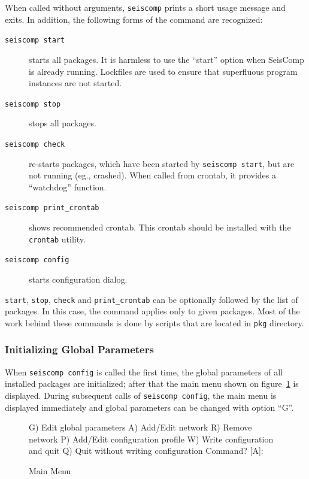 \documentclass[11pt,a4paper,titlepage]{article}
\newcommand{\dir}[1]{\texttt{#1}}
\newcommand{\cmd}[1]{\texttt{#1}}
\let\stditem\item
\newenvironment{cmdlist}{%
    \def\item[##1]{\stditem[\cmd{##1}]}%
    \begin{description}}
    {\end{description}}
\newcommand{\seiscomp}{SeisComp }
\begin{document}
When called without arguments, \cmd{seiscomp} prints a short usage message
and exits. In addition, the following forms of the command are recognized:
\begin{cmdlist}
\item[seiscomp start] starts all packages. It is harmless to use the
``start'' option when \seiscomp is already running. Lockfiles are used to
ensure that superfluous program instances are not started.

\item[seiscomp stop] stops all packages.

\item[seiscomp check] re-starts packages, which have been started by
\cmd{seiscomp start}, but are not running (eg., crashed). When called from
crontab, it provides a ``watchdog'' function.

\item[seiscomp print\_crontab] shows recommended crontab. This crontab
should be installed with the \cmd{crontab} utility.

\item[seiscomp config] starts configuration dialog.
\end{cmdlist}

\cmd{start}, \cmd{stop}, \cmd{check} and \cmd{print\_crontab} can be
optionally followed by the list of packages. In this case, the command
applies only to given packages. Most of the work behind these commands is
done by scripts that are located in \dir{pkg} directory.


\subsubsection{Initializing Global Parameters}\label{global}

When \cmd{seiscomp config} is called the first time, the global parameters of
all installed packages are initialized; after that the main menu shown on
figure~\ref{mainmenu} is displayed. During subsequent calls of \cmd{seiscomp
config}, the main menu is displayed immediately and global parameters can be
changed with option ``G''.

\begin{figure}[ht]
\centering
\begin{listing}
G) Edit global parameters
A) Add/Edit network
R) Remove network
P) Add/Edit configuration profile
W) Write configuration and quit
Q) Quit without writing configuration
Command? [A]:
\end{listing}
\caption{Main Menu}\label{mainmenu}
\end{figure}
\end{document}
